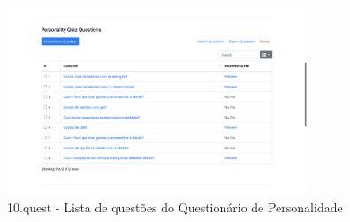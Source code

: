 \begin{figure}[ht!]
	\begin{center}
		\includegraphics[width=0.8\textwidth]{img/product/pq_questions}
		\caption{10.quest - Lista de questões do Questionário de Personalidade}
		\label{fig:pq_questions}
	\end{center}
\end{figure}


